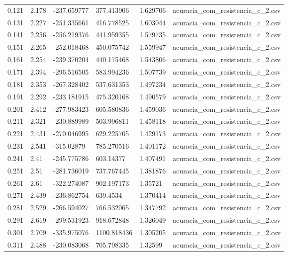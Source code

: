 \begin{table}
\begin{tabular}{llllll}
0.121 & 2.178 & -237.659777 & 377.413906 & 1.629706 & acuracia\_com\_resistencia\_c\_2.csv \\
0.131 & 2.227 & -251.335661 & 416.778525 & 1.603044 & acuracia\_com\_resistencia\_c\_2.csv \\
0.141 & 2.256 & -256.219376 & 441.959355 & 1.579735 & acuracia\_com\_resistencia\_c\_2.csv \\
0.151 & 2.265 & -252.018468 & 450.075742 & 1.559947 & acuracia\_com\_resistencia\_c\_2.csv \\
0.161 & 2.254 & -239.370204 & 440.175468 & 1.543806 & acuracia\_com\_resistencia\_c\_2.csv \\
0.171 & 2.394 & -296.516505 & 583.994236 & 1.507739 & acuracia\_com\_resistencia\_c\_2.csv \\
0.181 & 2.353 & -267.328402 & 537.631353 & 1.497234 & acuracia\_com\_resistencia\_c\_2.csv \\
0.191 & 2.292 & -233.181915 & 475.320168 & 1.490579 & acuracia\_com\_resistencia\_c\_2.csv \\
0.201 & 2.412 & -277.983423 & 605.580836 & 1.459036 & acuracia\_com\_resistencia\_c\_2.csv \\
0.211 & 2.321 & -230.889989 & 503.996811 & 1.458118 & acuracia\_com\_resistencia\_c\_2.csv \\
0.221 & 2.431 & -270.046995 & 629.225705 & 1.429173 & acuracia\_com\_resistencia\_c\_2.csv \\
0.231 & 2.541 & -315.02879 & 785.270516 & 1.401172 & acuracia\_com\_resistencia\_c\_2.csv \\
0.241 & 2.41 & -245.775786 & 603.14377 & 1.407491 & acuracia\_com\_resistencia\_c\_2.csv \\
0.251 & 2.51 & -281.736019 & 737.767445 & 1.381876 & acuracia\_com\_resistencia\_c\_2.csv \\
0.261 & 2.61 & -322.274087 & 902.197173 & 1.35721 & acuracia\_com\_resistencia\_c\_2.csv \\
0.271 & 2.439 & -236.862754 & 639.4534 & 1.370414 & acuracia\_com\_resistencia\_c\_2.csv \\
0.281 & 2.529 & -266.594027 & 766.532065 & 1.347792 & acuracia\_com\_resistencia\_c\_2.csv \\
0.291 & 2.619 & -299.531923 & 918.672848 & 1.326049 & acuracia\_com\_resistencia\_c\_2.csv \\
0.301 & 2.709 & -335.975076 & 1100.818436 & 1.305205 & acuracia\_com\_resistencia\_c\_2.csv \\
0.311 & 2.488 & -230.083068 & 705.798335 & 1.32599 & acuracia\_com\_resistencia\_c\_2.csv \\

\end{tabular}
\end{table}

